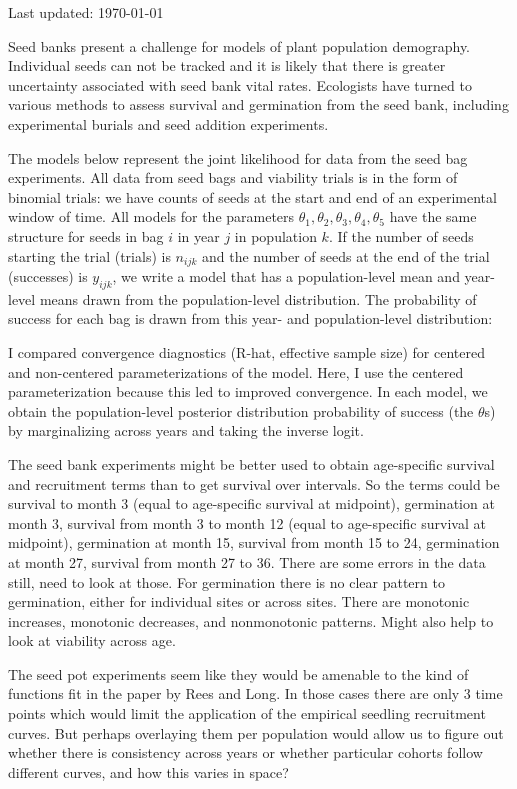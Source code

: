 \documentclass[12pt, oneside, titlepage]{article}   	%
\begin{document}
Last updated: \today

Seed banks present a challenge for models of plant population demography. Individual seeds can not be tracked and it is likely that there is greater uncertainty associated with seed bank vital rates. Ecologists have turned to various methods to assess survival and germination from the seed bank, including experimental burials and seed addition experiments.


The models below represent the joint likelihood for data from the seed bag experiments. All data from seed bags and viability trials is in the form of binomial trials: we have counts of seeds at the start and end of an experimental window of time. All models for the parameters $\theta_1, \theta_2, \theta_3, \theta_4, \theta_5$ have the same structure for seeds in bag $i$ in year $j$ in population $k$. If the number of seeds starting the trial (trials) is $n_{ijk}$ and the number of seeds at the end of the trial (successes) is $y_{ijk}$, we write a model that has a population-level mean and year-level means drawn from the population-level distribution. The probability of success for each bag is drawn from this year- and population-level distribution:

I compared convergence diagnostics (R-hat, effective sample size) for centered and non-centered parameterizations of the model. Here, I use the centered parameterization because this led to improved convergence. In each model, we obtain the population-level posterior distribution probability of success (the $\theta$s) by marginalizing across years and taking the inverse logit.

The seed bank experiments might be better used to obtain age-specific survival  and recruitment terms than to get survival over intervals. So the terms could be survival to month 3 (equal to age-specific survival at midpoint), germination at month 3, survival from month 3 to month 12 (equal to age-specific survival at midpoint), germination at month 15, survival from month 15 to 24, germination at month 27, survival from month 27 to 36. There are some errors in the data still, need to look at those. For germination there is no clear pattern to germination, either for individual sites or across sites. There are monotonic increases, monotonic decreases, and nonmonotonic patterns. Might also help to look at viability across age. 

The seed pot experiments seem like they would be amenable to the kind of functions fit in the paper by Rees and Long. In those cases there are only 3 time points which would limit the application of the empirical seedling recruitment curves. But perhaps overlaying them per population would allow us to figure out whether there is consistency across years or whether particular cohorts follow different curves, and how this varies in space?
\end{document}
